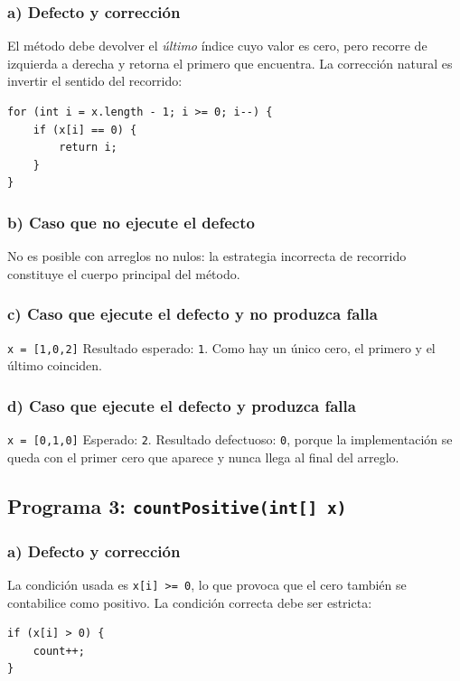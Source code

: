 \documentclass[12pt,a4paper]{article}
\begin{document}
\subsubsection*{a) Defecto y corrección}
El método debe devolver el \textit{último} índice cuyo valor es cero, pero recorre de izquierda a derecha y retorna el primero que encuentra. La corrección natural es invertir el sentido del recorrido:
\begin{lstlisting}[style=javastyle]
for (int i = x.length - 1; i >= 0; i--) {
    if (x[i] == 0) {
        return i;
    }
}
\end{lstlisting}

\subsubsection*{b) Caso que no ejecute el defecto}
No es posible con arreglos no nulos: la estrategia incorrecta de recorrido constituye el cuerpo principal del método.

\subsubsection*{c) Caso que ejecute el defecto y no produzca falla}
\texttt{x = [1,0,2]} \hspace{0.5cm} Resultado esperado: \texttt{1}. Como hay un único cero, el primero y el último coinciden.

\subsubsection*{d) Caso que ejecute el defecto y produzca falla}
\texttt{x = [0,1,0]} \hspace{0.5cm} Esperado: \texttt{2}. Resultado defectuoso: \texttt{0}, porque la implementación se queda con el primer cero que aparece y nunca llega al final del arreglo.

\subsection{Programa 3: \texttt{countPositive(int[] x)}}
\subsubsection*{a) Defecto y corrección}
La condición usada es \texttt{x[i] >= 0}, lo que provoca que el cero también se contabilice como positivo. La condición correcta debe ser estricta:
\begin{lstlisting}[style=javastyle]
if (x[i] > 0) {
    count++;
}
\end{lstlisting}
\end{document}
